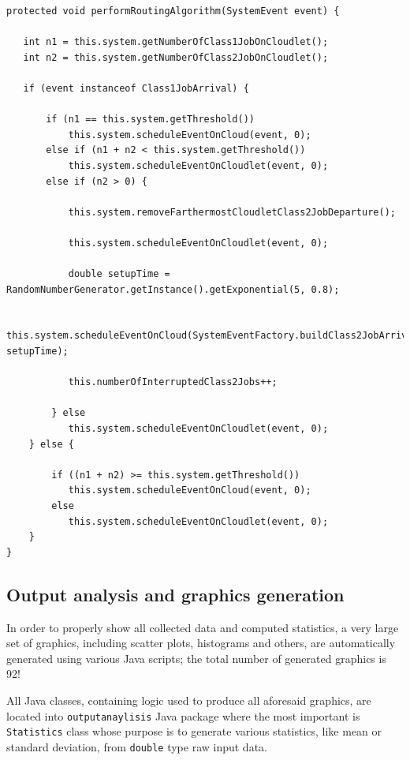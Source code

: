 \documentclass[10pt,a4paper]{article}
\begin{document}
\begin{lstlisting}[frame=lines, caption={\texttt{performRoutingAlgorithm} method implementation concerning access control algorithm 2.},label={code:performRoutingAlgorithm2}]
protected void performRoutingAlgorithm(SystemEvent event) {

   int n1 = this.system.getNumberOfClass1JobOnCloudlet();
   int n2 = this.system.getNumberOfClass2JobOnCloudlet();

   if (event instanceof Class1JobArrival) {

       if (n1 == this.system.getThreshold())
           this.system.scheduleEventOnCloud(event, 0);
       else if (n1 + n2 < this.system.getThreshold())
           this.system.scheduleEventOnCloudlet(event, 0);
       else if (n2 > 0) {

           this.system.removeFarthermostCloudletClass2JobDeparture();

           this.system.scheduleEventOnCloudlet(event, 0);

           double setupTime = RandomNumberGenerator.getInstance().getExponential(5, 0.8);

           this.system.scheduleEventOnCloud(SystemEventFactory.buildClass2JobArrival(), setupTime);

           this.numberOfInterruptedClass2Jobs++;

        } else
           this.system.scheduleEventOnCloudlet(event, 0);
    } else {

        if ((n1 + n2) >= this.system.getThreshold())
           this.system.scheduleEventOnCloud(event, 0);
        else
           this.system.scheduleEventOnCloudlet(event, 0);
    }
}
\end{lstlisting}


\subsection{Output analysis and graphics generation}

In order to properly show all collected data and computed statistics, a very large set of graphics, including scatter plots, histograms and others, are automatically generated using various Java scripts; the total number of generated graphics is 92! 

All Java classes, containing logic used to produce all aforesaid graphics, are located into \texttt{outputanaylisis} Java package where the most important is \texttt{Statistics} class whose purpose is to generate various statistics, like mean or standard deviation, from \texttt{double} type raw input data. 
\end{document}
